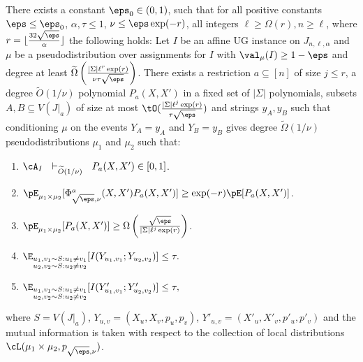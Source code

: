\begin{lemma}\label{lem:sp-j-restated}
There exists a constant $\eps_0 \in (0,1)$, such that for all positive constants $\eps \leq \eps_0$, $\alpha, \tau \leq 1$, $\nu \leq \eps \exp(-r)$, all integers $\ell \geq \Omega(r), n \geq \ell$, where $r = \lfloor \frac{32\sqrt{\eps}}{\alpha}\rfloor$ the following holds: Let $I$ be an affine UG instance on $J_{n,\ell,\alpha}$ and $\mu$ be a pseudodistribution over assignments for $I$ with $\val_\mu(I) \geq 1-\eps$ and degree at least $\widetilde{\Omega}\left(\frac{|\Sigma|\ell^r\exp(r)}{\nu\tau\sqrt{\eps}}\right)$. There exists a restriction $a \subseteq [n]$ of size $j \leq r$, a degree $\widetilde{O}(1/\nu)$ polynomial $P_a(X,X')$ in a fixed set of $|\Sigma|$ polynomials, subsets $A, B \subseteq V(J|_a)$ of size at most $\tO(\frac{|\Sigma|\ell^j\exp(r)}{\tau\sqrt{\eps}})$ and strings $y_A, y_B$ such that conditioning $\mu$ on the events $Y_A = y_A$ and $Y_B = y_B$ gives degree $\widetilde{\Omega}(1/\nu)$ pseudodistributions $\mu_1$ and $\mu_2$ such that:
\begin{enumerate}
\item $\cA_I  ~~\vdash_{\widetilde{O}(1/\nu)} ~~ P_a(X,X') \in [0,1]$.
\item $\pE_{\mu_1 \times \mu_2}[\Phi^a_{\sqrt{\eps},\nu}(X,X')P_a(X,X')] \geq \exp(-r) \pE[P_a(X,X')]$.
\item $\pE_{\mu_1 \times \mu_2}[P_a(X,X')] \geq \Omega\left(\frac{\sqrt{\eps}}{|\Sigma|\ell^{j}\exp(r)}\right)$.
\item $\E_{\substack{u_1,v_1 \sim S: u_1 \neq v_1\\ u_2,v_2 \sim S: u_2 \neq v_2}}[I(Y_{u_1,v_1};Y_{u_2,v_2})] \leq \tau.$
\item $\E_{\substack{u_1,v_1 \sim S: u_1 \neq v_1\\ u_2,v_2 \sim S: u_2 \neq v_2}}[I(Y'_{u_1,v_1};Y'_{u_2,v_2})] \leq \tau,$
\end{enumerate}
where $S = V(J|_a)$, $Y_{u,v} = (X_u,X_v,p_u,p_v)$, $Y'_{u,v} = (X'_u,X'_v,p'_u,p'_v)$ and the mutual information is taken with respect to the collection of local distributions $\cL(\mu_1 \times \mu_2,p_{\sqrt{\eps},\nu})$. 
\end{lemma}
